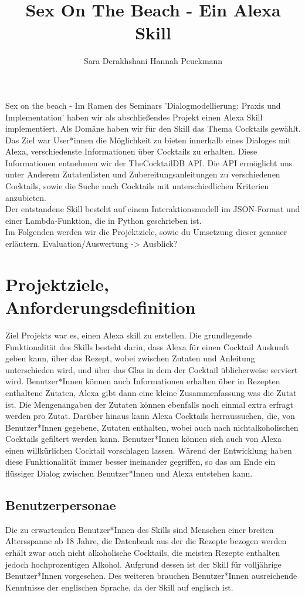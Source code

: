 \documentclass[12pt,letterpaper]{article}
\begin{document}
\title{Sex On The Beach - Ein Alexa Skill}
\author{Sara Derakhshani Hannah Peuckmann}
\maketitle
\thispagestyle{fancy}

Sex on the beach - Im Ramen des Seminars 'Dialogmodellierung: Praxis und Implementation' haben wir als abschließendes Projekt einen Alexa Skill implementiert. Als Domäne haben wir für den Skill das Thema Cocktails gewählt. \\Das Ziel war User*innen die Möglichkeit zu bieten innerhalb eines Dialoges mit Alexa, verschiedenste Informationen über Cocktails zu erhalten. Diese Informationen entnehmen wir der TheCocktailDB API. Die API ermöglicht uns unter Anderem Zutatenlisten und Zubereitungsanleitungen zu verschiedenen Cocktails, sowie die Suche nach Cocktails mit unterschiedlichen Kriterien anzubieten. \\ Der entstandene Skill besteht auf einem Interaktionsmodell im JSON-Format und einer Lambda-Funktion, die in Python geschrieben ist. \\
Im Folgenden werden wir die Projektziele, sowie du Umsetzung dieser genauer erläutern. Evaluation/Auswertung -> Ausblick?


\section{Projektziele, Anforderungsdefinition}

Ziel Projekts war es, einen Alexa skill zu erstellen.
Die grundlegende Funktionalität des Skills besteht darin, dass Alexa für einen Cocktail Auskunft geben kann,
über das Rezept, wobei zwischen Zutaten und Anleitung unterschieden wird, und über das Glas in dem der Cocktail
üblicherweise serviert wird. Benutzer*Innen können auch Informationen erhalten über in Rezepten enthaltene Zutaten,
Alexa gibt dann eine kleine Zusammenfassung was die Zutat ist. Die Mengenangaben der Zutaten können ebenfalls noch einmal extra erfragt werden pro Zutat.
Darüber hinaus kann Alexa Cocktails herraussuchen, die, von Benutzer*Innen
gegebene, Zutaten enthalten, wobei auch nach nichtalkoholischen Cocktails gefiltert werden kann. 
Benutzer*Innen können sich auch von Alexa einen willkürlichen Cocktail vorschlagen lassen.
Wärend der Entwicklung haben diese Funktionalität immer besser ineinander gegriffen, so das am Ende ein flüssiger Dialog
zwischen Benutzer*Innen und Alexa entstehen kann.
\subsection{Benutzerpersonae}
Die zu erwartenden Benutzer*Innen des Skills sind Menschen einer breiten Altersspanne ab 18 Jahre, die Datenbank aus der die Rezepte bezogen werden erhält zwar auch nicht alkoholische Cocktails, die meisten Rezepte enthalten jedoch hochprozentigen Alkohol. Aufgrund dessen ist der Skill für volljährige Benutzer*Innen vorgesehen. Des weiteren  brauchen Benutzer*Innen ausreichende Kenntnisse der englischen Sprache, da der Skill auf englisch ist.
\end{document}
